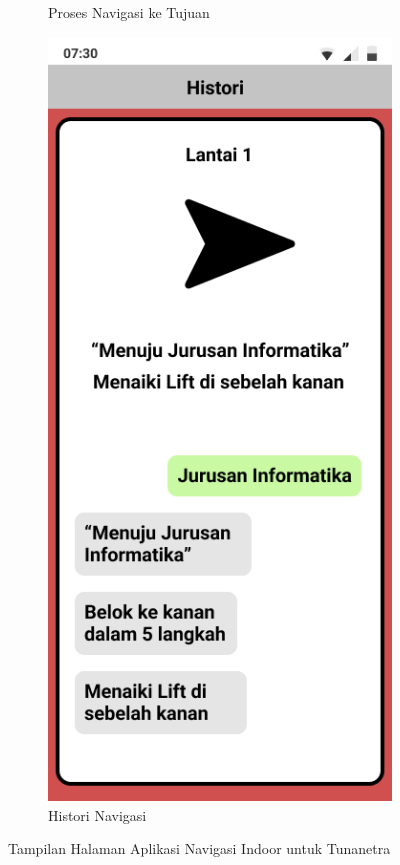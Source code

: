 \begin{enumerate}
\begin{figure} [H]
\begin{subfigure}{.5\textwidth}
  		\caption{Proses Navigasi ke Tujuan}
	\end{subfigure}
	\begin{subfigure}{.5\textwidth}
  		\centering
  		\includegraphics[width=.5\linewidth]{gambar/bab3/4}  
  		\caption{Histori Navigasi}
	\end{subfigure}
		\vspace{0.5cm}
		\caption{Tampilan Halaman Aplikasi Navigasi Indoor untuk Tunanetra}
	\label{aplikasimappingbagian1}
	\end{figure}

\end{enumerate}


